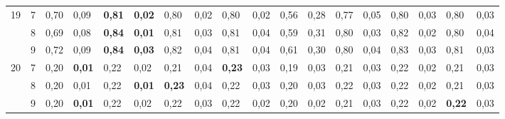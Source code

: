 \documentclass[conference]{IEEEtran}
\begin{document}
\begin{table}[]
\begin{tabular}{|cl|ll|ll|ll|ll|ll|ll|ll|ll|}
		\multicolumn{1}{|c|}{\multirow{3}{*}{19}} & 7 & \multicolumn{1}{l|}{0,70} & 0,09 & \multicolumn{1}{l|}{\textbf{0,81}} & \textbf{0,02} & \multicolumn{1}{l|}{0,80} & 0,02 & \multicolumn{1}{l|}{0,80} & 0,02 & \multicolumn{1}{l|}{0,56} & 0,28 & \multicolumn{1}{l|}{0,77} & 0,05 & \multicolumn{1}{l|}{0,80} & 0,03 & \multicolumn{1}{l|}{0,80} & 0,03 \\ \cline{2-18} 
		\multicolumn{1}{|c|}{} & 8 & \multicolumn{1}{l|}{0,69} & 0,08 & \multicolumn{1}{l|}{\textbf{0,84}} & \textbf{0,01} & \multicolumn{1}{l|}{0,81} & 0,03 & \multicolumn{1}{l|}{0,81} & 0,04 & \multicolumn{1}{l|}{0,59} & 0,31 & \multicolumn{1}{l|}{0,80} & 0,03 & \multicolumn{1}{l|}{0,82} & 0,02 & \multicolumn{1}{l|}{0,80} & 0,04 \\ \cline{2-18} 
		\multicolumn{1}{|c|}{} & 9 & \multicolumn{1}{l|}{0,72} & 0,09 & \multicolumn{1}{l|}{\textbf{0,84}} & \textbf{0,03} & \multicolumn{1}{l|}{0,82} & 0,04 & \multicolumn{1}{l|}{0,81} & 0,04 & \multicolumn{1}{l|}{0,61} & 0,30 & \multicolumn{1}{l|}{0,80} & 0,04 & \multicolumn{1}{l|}{0,83} & 0,03 & \multicolumn{1}{l|}{0,81} & 0,03 \\ \hline
		\multicolumn{1}{|c|}{\multirow{3}{*}{20}} & 7 & \multicolumn{1}{l|}{0,20} & \textbf{0,01} & \multicolumn{1}{l|}{0,22} & 0,02 & \multicolumn{1}{l|}{0,21} & 0,04 & \multicolumn{1}{l|}{\textbf{0,23}} & 0,03 & \multicolumn{1}{l|}{0,19} & 0,03 & \multicolumn{1}{l|}{0,21} & 0,03 & \multicolumn{1}{l|}{0,22} & 0,02 & \multicolumn{1}{l|}{0,21} & 0,03 \\ \cline{2-18} 
		\multicolumn{1}{|c|}{} & 8 & \multicolumn{1}{l|}{0,20} & 0,01 & \multicolumn{1}{l|}{0,22} & \textbf{0,01} & \multicolumn{1}{l|}{\textbf{0,23}} & 0,04 & \multicolumn{1}{l|}{0,22} & 0,03 & \multicolumn{1}{l|}{0,20} & 0,03 & \multicolumn{1}{l|}{0,22} & 0,03 & \multicolumn{1}{l|}{0,22} & 0,02 & \multicolumn{1}{l|}{0,21} & 0,03 \\ \cline{2-18} 
		\multicolumn{1}{|c|}{} & 9 & \multicolumn{1}{l|}{0,20} & \textbf{0,01} & \multicolumn{1}{l|}{0,22} & 0,02 & \multicolumn{1}{l|}{0,22} & 0,03 & \multicolumn{1}{l|}{0,22} & 0,02 & \multicolumn{1}{l|}{0,20} & 0,02 & \multicolumn{1}{l|}{0,21} & 0,03 & \multicolumn{1}{l|}{0,22} & 0,02 & \multicolumn{1}{l|}{\textbf{0,22}} & 0,03 \\ \hline
	\end{tabular}
\end{table}
\end{document}

